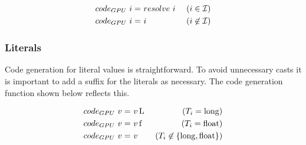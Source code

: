 \begin{align}
	code_{GPU}\ i = &\ resolve\ i &\ (i \in \mathcal{I})\\
	code_{GPU}\ i = &\ i &\ (i \not\in \mathcal{I})\notag
\end{align}

\subsubsection{Literals}
Code generation for literal values is straightforward. To avoid unnecessary casts it is important to add a suffix for the literals as necessary. The code generation function shown below reflects this.

\begin{align}
	code_{GPU}\ v = &\ v\operatorname{L} &\ (T_i = \operatorname{long})\\
	code_{GPU}\ v = &\ v\operatorname{f} &\ (T_i = \operatorname{float})\notag\\
	code_{GPU}\ v = &\ v &\ (T_i \not\in \{\operatorname{long},\operatorname{float}\})\notag
\end{align}